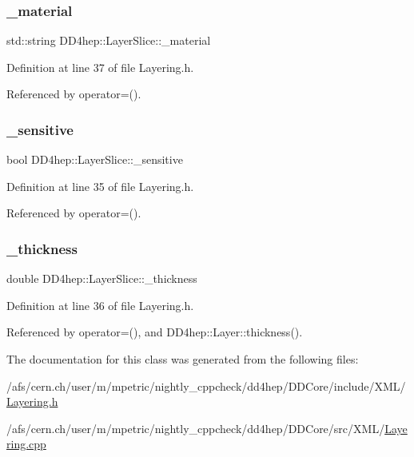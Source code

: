\subsubsection{\texorpdfstring{\+\_\+material}{\_material}}
{\footnotesize\ttfamily std\+::string D\+D4hep\+::\+Layer\+Slice\+::\+\_\+material}



Definition at line 37 of file Layering.\+h.



Referenced by operator=().

\hypertarget{class_d_d4hep_1_1_layer_slice_a0fd1f573e7323cd250cf874aca8e2575}{}\label{class_d_d4hep_1_1_layer_slice_a0fd1f573e7323cd250cf874aca8e2575} 
\subsubsection{\texorpdfstring{\+\_\+sensitive}{\_sensitive}}
{\footnotesize\ttfamily bool D\+D4hep\+::\+Layer\+Slice\+::\+\_\+sensitive}



Definition at line 35 of file Layering.\+h.



Referenced by operator=().

\hypertarget{class_d_d4hep_1_1_layer_slice_ab67de3b92d55a6b6169a310c9f18d326}{}\label{class_d_d4hep_1_1_layer_slice_ab67de3b92d55a6b6169a310c9f18d326} 
\subsubsection{\texorpdfstring{\+\_\+thickness}{\_thickness}}
{\footnotesize\ttfamily double D\+D4hep\+::\+Layer\+Slice\+::\+\_\+thickness}



Definition at line 36 of file Layering.\+h.



Referenced by operator=(), and D\+D4hep\+::\+Layer\+::thickness().



The documentation for this class was generated from the following files\+:\begin{DoxyCompactItemize}
\item 
/afs/cern.\+ch/user/m/mpetric/nightly\+\_\+cppcheck/dd4hep/\+D\+D\+Core/include/\+X\+M\+L/\hyperlink{_layering_8h}{Layering.\+h}\item 
/afs/cern.\+ch/user/m/mpetric/nightly\+\_\+cppcheck/dd4hep/\+D\+D\+Core/src/\+X\+M\+L/\hyperlink{_layering_8cpp}{Layering.\+cpp}\end{DoxyCompactItemize}
